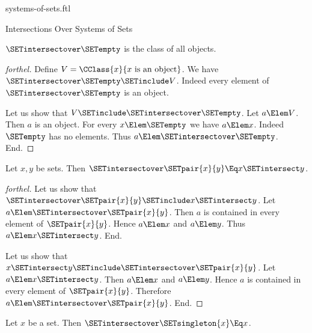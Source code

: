 \documentclass{stex}
\begin{document}
\begin{smodule}{systems-of-sets.ftl}
\begin{sfragment}{Intersections Over Systems of Sets}
  \begin{proposition}[forthel,id=FOUNDATIONS_10_2809770322952192]
    $\SETintersectover \SETempty$ is the class of all objects.
  \end{proposition}
  \begin{proof}[forthel]
    Define $V = \CClass{x}{x\text{ is an object}}$.
    We have $\SETintersectover \SETempty \SETinclude V$.
    Indeed every element of $\SETintersectover \SETempty$ is an object.

    Let us show that $V \SETinclude \SETintersectover \SETempty$.
      Let $a \Elem V$.
      Then $a$ is an object.
      For every $x \Elem \SETempty$ we have $a \Elem x$.
      Indeed $\SETempty$ has no elements.
      Thus $a \Elem \SETintersectover \SETempty$.
    End.
  \end{proof}

  \begin{proposition}[forthel,id=FOUNDATIONS_10_7851827447988224]
    Let $x, y$ be sets.
    Then $\SETintersectover \SETpair{x}{y} \Eq x \SETintersect y$.
  \end{proposition}
  \begin{proof}[forthel]
    Let us show that $\SETintersectover \SETpair{x}{y} \SETinclude x \SETintersect y$.
      Let $a \Elem \SETintersectover \SETpair{x}{y}$.
      Then $a$ is contained in every element of $\SETpair{x}{y}$.
      Hence $a \Elem x$ and $a \Elem y$.
      Thus $a \Elem x \SETintersect y$.
    End.

    Let us show that $x \SETintersect y \SETinclude \SETintersectover \SETpair{x}{y}$.
      Let $a \Elem x \SETintersect y$.
      Then $a \Elem x$ and $a \Elem y$.
      Hence $a$ is contained in every element of $\SETpair{x}{y}$.
      Therefore $a \Elem \SETintersectover \SETpair{x}{y}$.
    End.
  \end{proof}

  \begin{corollary}[forthel,id=FOUNDATIONS_10_7239895674257408]
    Let $x$ be a set.
    Then $\SETintersectover \SETsingleton{x} \Eq x$.
  \end{corollary}
\end{sfragment}
\end{smodule}
\end{document}
